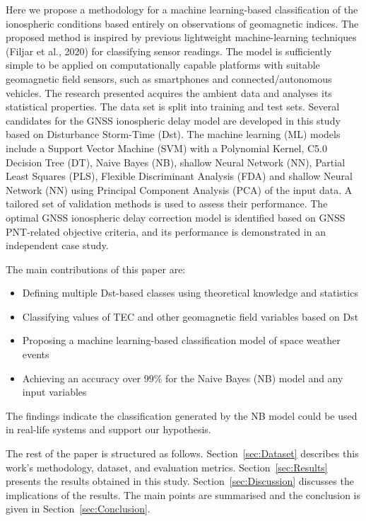 \documentclass[sn-mathphys-num]{sn-jnl}%
\begin{document}
Here we propose a methodology for a machine learning-based classification of the ionospheric conditions based entirely on observations of geomagnetic indices. The proposed method is inspired by previous lightweight machine-learning techniques (Filjar et al., 2020) for classifying sensor readings. The model is sufficiently simple to be applied on computationally capable platforms with suitable geomagnetic field sensors, such as smartphones and connected/autonomous vehicles. The research presented acquires the ambient data and analyses its statistical properties. The data set is split into training and test sets. Several candidates for the GNSS ionospheric delay model are developed in this study based on Disturbance Storm-Time (Dst). The machine learning (ML) models include a Support Vector Machine (SVM) with a Polynomial Kernel, C5.0 Decision Tree (DT), Naive Bayes (NB), shallow Neural Network (NN), Partial Least Squares (PLS), Flexible Discriminant Analysis (FDA) and shallow Neural Network (NN) using Principal Component Analysis (PCA) of the input data. A tailored set of validation methods is used to assess their performance. The optimal GNSS ionospheric delay correction model is identified based on GNSS PNT-related objective criteria, and its performance is demonstrated in an independent case study.

The main contributions of this paper are:

\begin{itemize}
    \item Defining multiple Dst-based classes using theoretical knowledge and statistics
    \item Classifying values of TEC and other geomagnetic field variables based on Dst
    \item Proposing a machine learning-based classification model of space weather events
    \item Achieving an accuracy over $99\%$ for the Naive Bayes (NB) model and any input variables
\end{itemize}

The findings indicate the classification generated by the NB model could be used in real-life systems and support our hypothesis.

The rest of the paper is structured as follows. Section~\ref{sec:Dataset} describes this work's methodology, dataset, and evaluation metrics. Section~\ref{sec:Results} presents the results obtained in this study. Section~\ref{sec:Discussion} discusses the implications of the results. The main points are summarised and the conclusion is given in Section~\ref{sec:Conclusion}.
\end{document}
